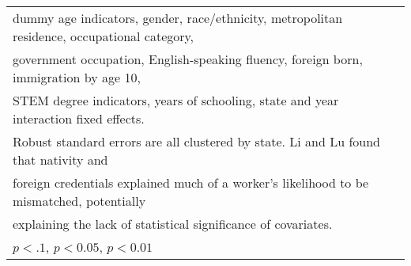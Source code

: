 \begin{table}[htbp]
\begin{tabular}{l*{5}{c}}
\multicolumn{6}{l}{\footnotesize dummy age indicators, gender, race/ethnicity, metropolitan residence, occupational category,}\\
\multicolumn{6}{l}{\footnotesize government occupation, English-speaking fluency, foreign born, immigration by age 10,}\\
\multicolumn{6}{l}{\footnotesize STEM degree indicators, years of schooling, state and year interaction fixed effects.}\\
\multicolumn{6}{l}{\footnotesize Robust standard errors are all clustered by state. Li and Lu found that nativity and}\\
\multicolumn{6}{l}{\footnotesize foreign credentials explained much of a worker's likelihood to be mismatched, potentially}\\
\multicolumn{6}{l}{\footnotesize explaining the lack of statistical significance of covariates.}\\
\multicolumn{6}{l}{\footnotesize \sym{*} \(p<.1\), \sym{**} \(p<0.05\), \sym{***} \(p<0.01\)}\\
\end{tabular}
\end{table}
